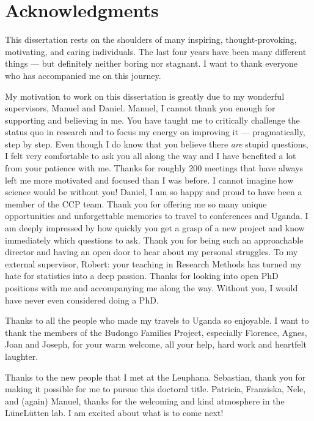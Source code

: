 \documentclass[
]{scrbook}
\begin{document}
\begin{titlepage}
\begin{flushleft}
\begin{normalsize}
        \end{normalsize}
    \end{flushleft}
    
\end{titlepage}

\chapter{Acknowledgments}\label{acknowledgments}

This dissertation rests on the shoulders of many inspiring, thought-provoking, motivating, and caring individuals. The last four years have been many different things --- but definitely neither boring nor stagnant. I want to thank everyone who has accompanied me on this journey.

My motivation to work on this dissertation is greatly due to my wonderful supervisors, Manuel and Daniel. Manuel, I cannot thank you enough for supporting and believing in me. You have taught me to critically challenge the status quo in research and to focus my energy on improving it --- pragmatically, step by step. Even though I do know that you believe there \emph{are} stupid questions, I felt very comfortable to ask you all along the way and I have benefited a lot from your patience with me. Thanks for roughly 200 meetings that have always left me more motivated and focused than I was before. I cannot imagine how science would be without you! Daniel, I am so happy and proud to have been a member of the CCP team. Thank you for offering me so many unique opportunities and unforgettable memories to travel to conferences and Uganda. I am deeply impressed by how quickly you get a grasp of a new project and know immediately which questions to ask. Thank you for being such an approachable director and having an open door to hear about my personal struggles. To my external supervisor, Robert: your teaching in Research Methods has turned my hate for statistics into a deep passion. Thanks for looking into open PhD positions with me and accompanying me along the way. Without you, I would have never even considered doing a PhD.

Thanks to all the people who made my travels to Uganda so enjoyable. I want to thank the members of the Budongo Families Project, especially Florence, Agnes, Joan and Joseph, for your warm welcome, all your help, hard work and heartfelt laughter.

Thanks to the new people that I met at the Leuphana. Sebastian, thank you for making it possible for me to pursue this doctoral title. Patricia, Franziska, Nele, and (again) Manuel, thanks for the welcoming and kind atmosphere in the LüneLütten lab. I am excited about what is to come next!
\end{document}
